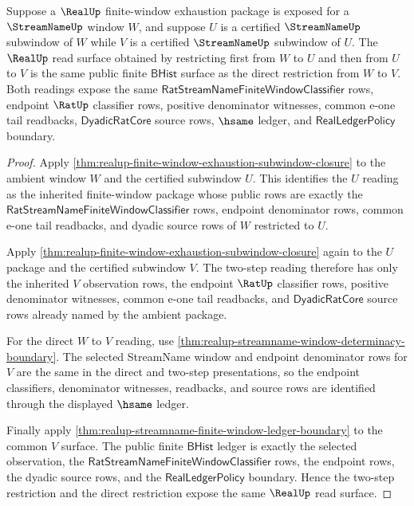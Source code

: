 \begin{theorem}
\label{thm:realup-finite-window-two-step-restriction-coherence}
Suppose a $\RealUp$ finite-window exhaustion package is exposed for a
$\StreamNameUp$ window $W$, and suppose $U$ is a certified $\StreamNameUp$
subwindow of $W$ while $V$ is a certified $\StreamNameUp$ subwindow of $U$. The
$\RealUp$ read surface obtained by restricting first from $W$ to $U$ and then
from $U$ to $V$ is the same public finite $\mathsf{BHist}$ surface as the direct
restriction from $W$ to $V$. Both readings expose the same
$\mathsf{RatStreamNameFiniteWindowClassifier}$ rows, endpoint $\RatUp$
classifier rows, positive denominator witnesses, common e-one tail readbacks,
$\mathsf{DyadicRatCore}$ source rows, $\hsame$ ledger, and
$\mathsf{RealLedgerPolicy}$ boundary.
\end{theorem}
\begin{proof}
Apply
\autoref{thm:realup-finite-window-exhaustion-subwindow-closure} to the ambient
window $W$ and the certified subwindow $U$. This identifies the $U$ reading as
the inherited finite-window package whose public rows are exactly the
$\mathsf{RatStreamNameFiniteWindowClassifier}$ rows, endpoint denominator rows,
common e-one tail readbacks, and dyadic source rows of $W$ restricted to $U$.

Apply
\autoref{thm:realup-finite-window-exhaustion-subwindow-closure} again to the
$U$ package and the certified subwindow $V$. The two-step reading therefore has
only the inherited $V$ observation rows, the endpoint $\RatUp$ classifier rows,
positive denominator witnesses, common e-one tail readbacks, and
$\mathsf{DyadicRatCore}$ source rows already named by the ambient package.

For the direct $W$ to $V$ reading, use
\autoref{thm:realup-streamname-window-determinacy-boundary}. The selected
StreamName window and endpoint denominator rows for $V$ are the same in the
direct and two-step presentations, so the endpoint classifiers, denominator
witnesses, readbacks, and source rows are identified through the displayed
$\hsame$ ledger.

Finally apply
\autoref{thm:realup-streamname-finite-window-ledger-boundary} to the common
$V$ surface. The public finite $\mathsf{BHist}$ ledger is exactly the selected
observation, the $\mathsf{RatStreamNameFiniteWindowClassifier}$ rows, the
endpoint rows, the dyadic source rows, and the
$\mathsf{RealLedgerPolicy}$ boundary. Hence the two-step restriction and the
direct restriction expose the same $\RealUp$ read surface.
\end{proof}

